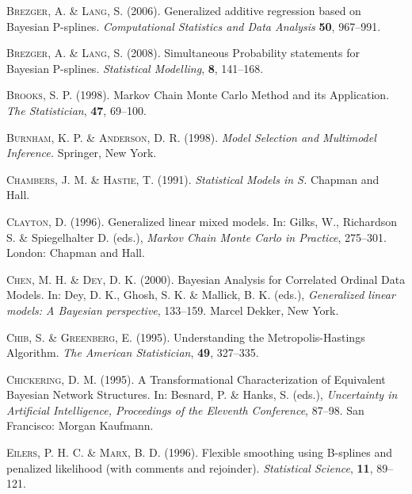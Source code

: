\begin{thebibliography}{99}
 {\scshape Brezger, A. \& Lang, S.} (2006).
 Generalized additive regression based on Bayesian P-splines.
 {\it Computational Statistics and Data Analysis} {\bf 50}, 967--991.

 {\scshape Brezger, A. \& Lang, S.} (2008).
Simultaneous Probability statements for Bayesian P-splines. {\it
Statistical Modelling}, {\bf 8},
      141--168.

 {\scshape Brooks, S. P.} (1998).
 Markov Chain Monte Carlo Method and its Application.
 {\it The Statistician}, {\bf 47}, 69--100.

 {\scshape Burnham, K. P. \& Anderson, D. R.} (1998).
 {\it Model Selection and Multimodel Inference.}
 Springer, New York.

 {\scshape Chambers, J. M. \& Hastie, T.} (1991).
 {\it Statistical Models in S.}
 Chapman and Hall.

 {\scshape Clayton, D.} (1996).
 Generalized linear mixed models.
 In: Gilks, W., Richardson S. \& Spiegelhalter D. (eds.),
{\it Markov Chain Monte Carlo in Practice}, 275--301.
 London: Chapman and Hall.

 {\scshape Chen, M. H. \& Dey, D. K.} (2000).
 Bayesian Analysis for Correlated Ordinal Data Models.
 In: Dey, D. K., Ghosh, S. K. \& Mallick, B. K. (eds.),
 {\it Generalized linear models: A Bayesian perspective}, 133--159.
 Marcel Dekker, New York.

 {\scshape Chib, S. \& Greenberg, E.} (1995).
 Understanding the Metropolis-Hastings Algorithm.
 {\it The American Statistician}, {\bf 49}, 327--335.

 {\scshape Chickering, D. M.} (1995).
 A Transformational Characterization of Equivalent Bayesian Network Structures.
 In: Besnard, P. \& Hanks, S. (eds.),
 {\it Uncertainty in Artificial Intelligence, Proceedings of the Eleventh Conference},  87--98.
 San Francisco: Morgan Kaufmann.

 {\scshape Eilers, P. H. C. \& Marx, B. D.} (1996).
 Flexible smoothing using B-splines and penalized likelihood (with comments and rejoinder).
 {\it Statistical Science}, {\bf 11}, 89--121.


\end{thebibliography}

